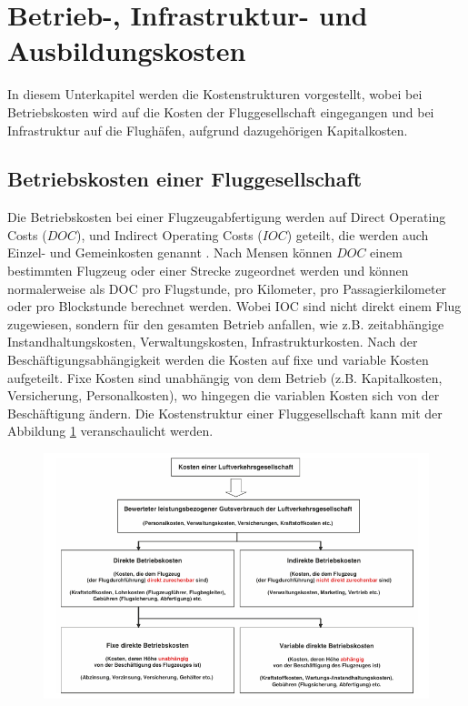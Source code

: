 \section{Betrieb-, Infrastruktur- und Ausbildungskosten}
\label{s:Kosten}
In diesem Unterkapitel werden die Kostenstrukturen vorgestellt, wobei bei Betriebskosten wird auf die Kosten der Fluggesellschaft
eingegangen und bei Infrastruktur auf die Flughäfen, aufgrund dazugehörigen Kapitalkosten.

\subsection{Betriebskosten einer Fluggesellschaft}

Die Betriebskosten bei einer Flugzeugabfertigung werden auf Direct Operating Costs ($DOC$), und Indirect Operating Costs 
($IOC$) geteilt, die werden auch Einzel- und Gemeinkosten genannt \cite{conrady2019luftverkehr}. 
Nach Mensen \cite{mensen2013handbuch} können $DOC$ einem bestimmten Flugzeug oder einer Strecke zugeordnet 
werden und können normalerweise als DOC pro Flugstunde, pro Kilometer, pro Passagierkilometer oder pro Blockstunde 
berechnet werden. Wobei IOC sind nicht direkt einem Flug zugewiesen, sondern für den gesamten Betrieb anfallen, wie z.B. zeitabhängige 
Instandhaltungskosten, Verwaltungskosten, Infrastrukturkosten. Nach der Beschäftigungsabhängigkeit werden die Kosten auf fixe und variable Kosten aufgeteilt. 
Fixe Kosten sind unabhängig von dem Betrieb (z.B. Kapitalkosten, Versicherung, Personalkosten), wo hingegen die variablen Kosten sich 
von der Beschäftigung ändern.
%
Die Kostenstruktur einer Fluggesellschaft kann mit der Abbildung \ref{doc} veranschaulicht werden.

\begin{figure}[h]
	\centering
	\includegraphics[width=0.9\linewidth]{Bilder/Systematik der DOC_Berechnung.png}
	\caption[DOC]{ \cite{mensen2013handbuch}}
	\label{doc}
\end{figure}

